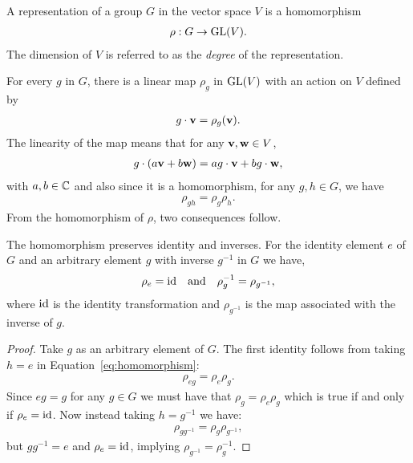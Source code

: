 \begin{definition}[Representation]\cite{Serre}
	A representation of a group $G$ in the vector space $V$ is a homomorphism
	\begin{align}\label{eq:DefRepr}
		\rho: G \rightarrow \text{GL}(V).
	\end{align}
	The dimension of $V$ is referred to as the \textit{degree} of the representation.
\end{definition}
For every $g$ in $G$, there is a linear map $\rho_g$ in $\text{GL}(V)$ with an action on $V$ defined by 
\begin{align*}
	g \cdot \mathbf{v} = \rho_g (\mathbf{v}).
\end{align*}
The linearity of the map means that for any $\mathbf{v}, \mathbf{w} \in V$,
\begin{align}\label{eq:linearityOfg}
	g \cdot (a\mathbf{v} + b\mathbf{w}) = ag\cdot\mathbf{v} + bg\cdot\mathbf{w},
\end{align} 
with $a,b \in \mathbb{C}$ and also since it is a homomorphism, for any $g,h \in G$, we have
\begin{align}\label{eq:homomorphism}
	\rho_{gh} = \rho_g \rho_h.
\end{align}
From the homomorphism of $\rho$, two consequences follow.
\begin{proposition}\label{prop:homoidinv}
	The homomorphism preserves identity and inverses. For the identity element $e$ of $G$ and an arbitrary element $g$ with inverse $g^{-1}$ in $G$ we have,
	\begin{align}\label{eq:rhoIdAndInv}
		\rho_e = \text{id} \quad \text{and} \quad \rho_g^{-1} = \rho_{g^{-1}},
	\end{align}
	where $\text{id}$ is the identity transformation and $\rho_{g^{-1}}$ is the map associated with the inverse of $g$.
\end{proposition}
\begin{proof}
	Take $g$ as an arbitrary element of $G$. The first identity follows from taking $h=e$ in Equation~\ref{eq:homomorphism}:
	\begin{align*}
		\rho_{eg} = \rho_e \rho_g.
	\end{align*}
	Since $eg=g$ for any $g\in G$ we must have that $\rho_g = \rho_e\rho_g$ which is true if and only if $\rho_e = \text{id}$. Now instead taking $h=g^{-1}$ we have:
	\begin{align*}
		\rho_{gg^{-1}} = \rho_g \rho_{g^{-1}},
	\end{align*}
	but $gg^{-1} = e$ and $\rho_e = \text{id}$, implying $\rho_{g^{-1}} = \rho_g^{-1}$.
\end{proof}

